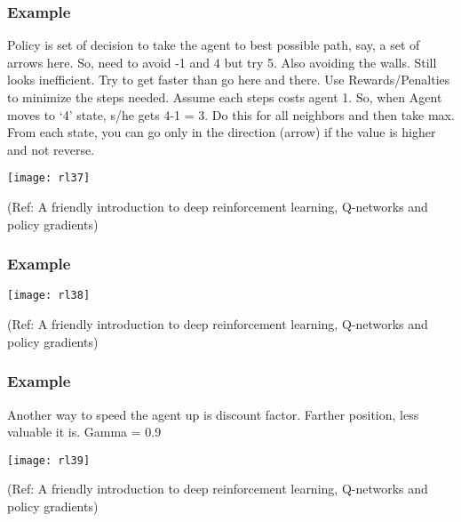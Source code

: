 \begin{frame}[fragile]\frametitle{Example}

Policy is set of decision to take the agent to best possible path, say, a set of arrows here. So, need to avoid -1 and 4 but try 5. Also avoiding the walls. Still looks inefficient. Try to get faster than go here and there. Use Rewards/Penalties to minimize the steps needed. Assume each steps costs agent 1. So, when Agent moves to ‘4’ state, s/he gets 4-1 = 3. Do this for all neighbors and then take max. From each state, you can go only in the direction (arrow) if the value is higher and not reverse.

\begin{center}
\texttt{[image: rl37]}
\end{center}

{\tiny (Ref: A friendly introduction to deep reinforcement learning, Q-networks and policy gradients)}

\end{frame}

\begin{frame}[fragile]\frametitle{Example}

\begin{center}
\texttt{[image: rl38]}
\end{center}

{\tiny (Ref: A friendly introduction to deep reinforcement learning, Q-networks and policy gradients)}

\end{frame}

\begin{frame}[fragile]\frametitle{Example}

Another way to speed the agent up is discount factor. Farther position, less valuable it is. Gamma = 0.9

\begin{center}
\texttt{[image: rl39]}
\end{center}

{\tiny (Ref: A friendly introduction to deep reinforcement learning, Q-networks and policy gradients)}

\end{frame}

